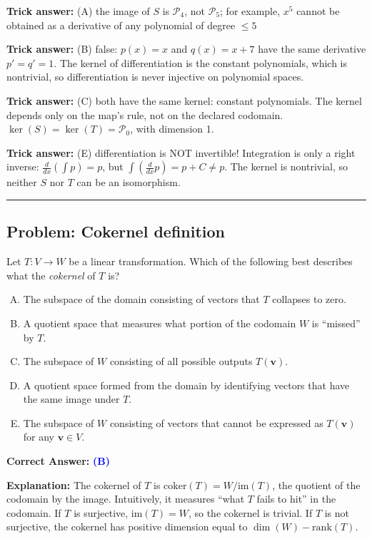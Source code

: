 \documentclass[12pt]{amsart}
\newcommand{\divider}{
  \vspace{-1em}
  \noindent
  \raisebox{-0.15ex}{\textbullet}%
  \hspace{0.5em}%
  \rule[0.5ex]{0.95\textwidth}{1.0pt}%
  \hspace{0.5em}%
  \raisebox{-0.15ex}{\textbullet}%
  \vspace{0em}
}
\begin{document}
\textbf{Trick answer:} (A) the image of $S$ is $\mathcal{P}_4$, not $\mathcal{P}_5$; for example, $x^5$ cannot be obtained as a derivative of any polynomial of degree $\leq 5$

\textbf{Trick answer:} (B) false: $p(x) = x$ and $q(x) = x + 7$ have the same derivative $p' = q' = 1$. The kernel of differentiation is the constant polynomials, which is nontrivial, so differentiation is never injective on polynomial spaces.

\textbf{Trick answer:} (C) both have the same kernel: constant polynomials. The kernel depends only on the map's rule, not on the declared codomain. $\ker(S) = \ker(T) = \mathcal{P}_0$, with dimension 1.

\textbf{Trick answer:} (E) differentiation is NOT invertible! Integration is only a right inverse: $\frac{d}{dx}(\int p) = p$, but $\int(\frac{d}{dx}p) = p + C \neq p$. The kernel is nontrivial, so neither $S$ nor $T$ can be an isomorphism.

\divider

\subsection*{Problem: Cokernel definition}

Let $T: V \to W$ be a linear transformation. Which of the following best describes what the \emph{cokernel} of $T$ is?

\begin{enumerate}[(A)]
\item The subspace of the domain consisting of vectors that $T$ collapses to zero.

\item A quotient space that measures what portion of the codomain $W$ is ``missed'' by $T$.

\item The subspace of $W$ consisting of all possible outputs $T(\mathbf{v})$.

\item A quotient space formed from the domain by identifying vectors that have the same image under $T$.

\item The subspace of $W$ consisting of vectors that cannot be expressed as $T(\mathbf{v})$ for any $\mathbf{v} \in V$.
\end{enumerate}

\textbf{Correct Answer:} \textcolor{blue}{\textbf{(B)}}

\textbf{Explanation:} The cokernel of $T$ is $\text{coker}(T) = W / \text{im}(T)$, the quotient of the codomain by the image. Intuitively, it measures ``what $T$ fails to hit'' in the codomain. If $T$ is surjective, $\text{im}(T) = W$, so the cokernel is trivial. If $T$ is not surjective, the cokernel has positive dimension equal to $\dim(W) - \text{rank}(T)$.
\end{document}
